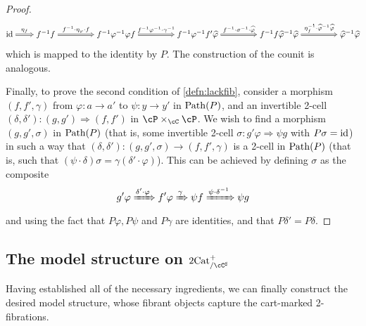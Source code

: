 \documentclass[11pt, dvipsnames]{amsart}
\begin{document}
\begin{proof}
	\[\begin{tikzcd}[ampersand replacement=\&,cramped,column sep=22pt]
		\id \& {f^{-1}f} \&\& {f^{-1}\varphi^{-1}\varphi f} \&\& {f^{-1}\varphi^{-1}f'\widehat{\varphi}} \&\& {f^{-1}f\widehat{\varphi}^{-1}\widehat{\varphi}} \&\& {\widehat{\varphi}^{-1}\widehat{\varphi}}
		\arrow["{\eta_{f}}", Rightarrow, from=1-1, to=1-2]
		\arrow["{f^{-1}\cdot \eta_{\varphi} \cdot f}", Rightarrow, from=1-2, to=1-4]
		\arrow["{f^{-1}\varphi^{-1}\cdot \gamma^{-1}}", Rightarrow, from=1-4, to=1-6]
		\arrow["{f^{-1}\cdot \sigma^{-1}\cdot\widehat{\varphi}}", Rightarrow, from=1-6, to=1-8]
		\arrow["{\eta_{f}^{-1}\cdot \widehat{\varphi}^{-1}\widehat{\varphi}}", Rightarrow, from=1-8, to=1-10]
	\end{tikzcd}\]
which is mapped to the identity by $P$. The construction of the counit is analogous.

Finally, to prove the second condition of \cref{defn:lackfib}, consider a morphism $(f,f',\gamma)$ from $\varphi\colon a\to a'$ to $\psi\colon y\to y'$ in $\mathrm{Path}(P)$, and an invertible 2-cell $(\delta, \delta')\colon (g,g')\Rightarrow (f,f')$ in $\cP\times_\cC \cP$. We wish to find a morphism $(g,g',\sigma)$ in $\mathrm{Path}(P)$ (that is, some invertible 2-cell $\sigma\colon g' \varphi\Rightarrow \psi g$ with $P\sigma=\mathrm{id}$) in such a way that $(\delta,\delta')\colon (g,g',\sigma)\to (f,f',\gamma)$ is a 2-cell in $\mathrm{Path}(P)$ (that is, such that $(\psi\cdot \delta)\sigma=\gamma(\delta'\cdot \varphi)$). This can be achieved by defining $\sigma$ as the composite
\[g' \varphi\xRightarrow{\delta' \cdot \varphi} f' \varphi\xRightarrow{\gamma} \psi f\xRightarrow{\psi\cdot \delta^{-1}} \psi g\]
and using the fact that $P\varphi,P\psi$ and $P\gamma$ are identities, and that $P\delta'=P\delta$.
\end{proof}


    \subsection{The model structure on \texorpdfstring{$\mslicetwocat$}{the marked slice category}}\label{sec:theMS}

    Having established all of the necessary ingredients, we can finally construct the desired model structure, whose fibrant objects capture the cart-marked 2-fibrations.
\end{document}
